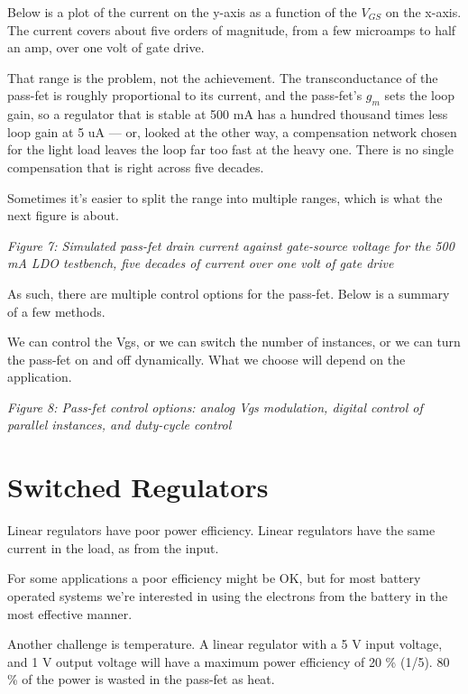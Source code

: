 Below is a plot of the current on the y-axis as a function of the
\(V_{GS}\) on the x-axis. The current covers about five orders of
magnitude, from a few microamps to half an amp, over one volt of gate
drive.

That range is the problem, not the achievement. The transconductance of
the pass-fet is roughly proportional to its current, and the pass-fet's
\(g_m\) sets the loop gain, so a regulator that is stable at 500 mA has
a hundred thousand times less loop gain at 5 uA --- or, looked at the
other way, a compensation network chosen for the light load leaves the
loop far too fast at the heavy one. There is no single compensation that
is right across five decades.

Sometimes it's easier to split the range into multiple ranges, which is
what the next figure is about.


{
\centering
{}
}

\emph{Figure 7: Simulated pass-fet drain current against gate-source
voltage for the 500 mA LDO testbench, five decades of current over one
volt of gate drive}

As such, there are multiple control options for the pass-fet. Below is a
summary of a few methods.

We can control the Vgs, or we can switch the number of instances, or we
can turn the pass-fet on and off dynamically. What we choose will depend
on the application.


{
\centering
{}
}

\emph{Figure 8: Pass-fet control options: analog Vgs modulation, digital
control of parallel instances, and duty-cycle control}

\section{Switched Regulators}\label{switched-regulators}

Linear regulators have poor power efficiency. Linear regulators have the
same current in the load, as from the input.

For some applications a poor efficiency might be OK, but for most
battery operated systems we're interested in using the electrons from
the battery in the most effective manner.

Another challenge is temperature. A linear regulator with a 5 V input
voltage, and 1 V output voltage will have a maximum power efficiency of
20 \% (1/5). 80 \% of the power is wasted in the pass-fet as heat.

